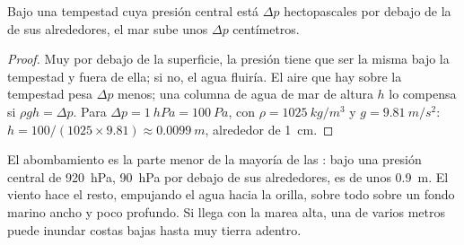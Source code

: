 \begin{proposition}\label{prop:g10:storms-and-cyclones:bulge}
Bajo una tempestad cuya presión central está $\Delta p$ hectopascales por
debajo de la de sus alrededores, el mar sube unos $\Delta p$ centímetros.
\end{proposition}

\begin{proof}
Muy por debajo de la superficie, la presión tiene que ser la misma bajo la
tempestad y fuera de ella; si no, el agua fluiría. El aire que hay sobre la
tempestad pesa $\Delta p$ menos; una columna de agua de mar de altura $h$ lo
compensa si $\rho g h = \Delta p$. Para $\Delta p = \qty{1}{hPa} = \qty{100}{Pa}$, con $\rho = \qty{1025}{kg/m^3}$ y $g = \qty{9.81}{m/s^2}$:
$h = 100/(1025
\times 9.81) \approx \qty{0.0099}{m}$, alrededor de \qty{1}{cm}.
\end{proof}

El abombamiento es la parte menor de la mayoría de las :
bajo una presión central de \qty{920}{hPa}, \qty{90}{hPa} por debajo de sus
alrededores, es de unos \qty{0.9}{m}. El viento hace el resto, empujando el
agua hacia la orilla, sobre todo sobre un fondo marino ancho y poco
profundo. Si llega con la marea alta, una  de varios metros
puede inundar costas bajas hasta muy tierra adentro.

